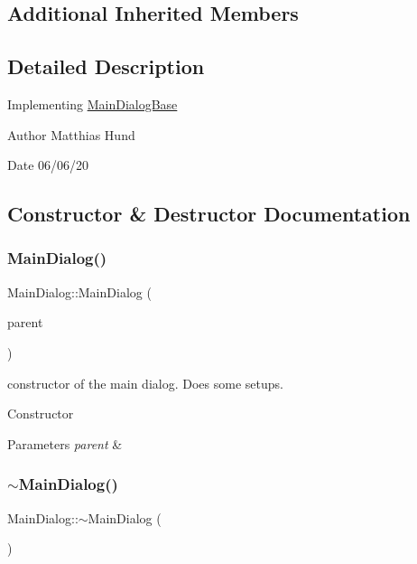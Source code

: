 \subsection*{Additional Inherited Members}


\subsection{Detailed Description}
Implementing \hyperlink{classMainDialogBase}{Main\+Dialog\+Base}

\begin{DoxyAuthor}{Author}
Matthias Hund 
\end{DoxyAuthor}
\begin{DoxyDate}{Date}
06/06/20 
\end{DoxyDate}


\subsection{Constructor \& Destructor Documentation}
\mbox{\label{classMainDialog_ae4bae8f15a5729712a7fd4effd078063}} 
\subsubsection{\texorpdfstring{Main\+Dialog()}{MainDialog()}}
{\footnotesize\ttfamily Main\+Dialog\+::\+Main\+Dialog (\begin{DoxyParamCaption}\item[{wx\+Window $\ast$}]{parent }\end{DoxyParamCaption})}



constructor of the main dialog. Does some setups. 

Constructor


\begin{DoxyParams}{Parameters}
{\em parent} & \\
\hline
\end{DoxyParams}
\mbox{\label{classMainDialog_a33d8e8327530b31387876b19f6542cc5}} 
\subsubsection{\texorpdfstring{$\sim$\+Main\+Dialog()}{~MainDialog()}}
{\footnotesize\ttfamily Main\+Dialog\+::$\sim$\+Main\+Dialog (\begin{DoxyParamCaption}{ }\end{DoxyParamCaption})}



